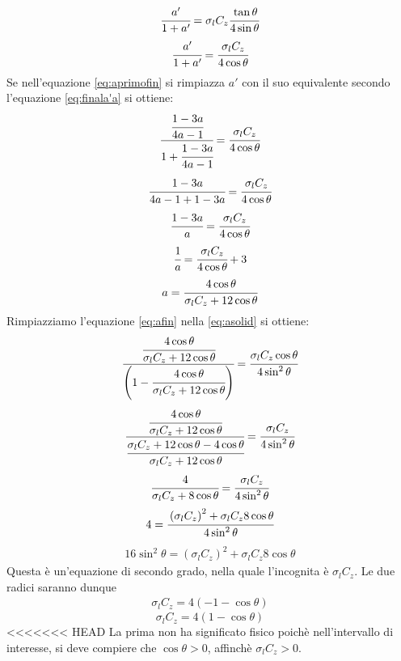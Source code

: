\begin{align*}
\cfrac{a'}{1+a'} = \sigma_l C_z \cfrac{\tan \theta}{4 \sin \theta}
\end{align*}
\begin{equation}\label{eq:aprimofin}
\cfrac{a'}{1+a'} = \cfrac{\sigma_l C_z}{4 \cos \theta}
\end{equation}
Se nell'equazione \ref{eq:aprimofin} si rimpiazza $a'$ con il suo equivalente secondo l'equazione \ref{eq:finala'a} si ottiene:
\begin{align*}
\cfrac{\cfrac{1-3a}{4a-1}}{1+\cfrac{1-3a}{4a-1}} = \cfrac{\sigma_l C_z}{4 \cos \theta}
\end{align*}
\begin{align*}
\cfrac{1-3a}{4a-1+1-3a} = \cfrac{\sigma_l C_z}{4 \cos \theta}
\end{align*}
\begin{align*}
\cfrac{1-3a}{a} = \cfrac{\sigma_l C_z }{4 \cos \theta}
\end{align*}
\begin{align*}
\cfrac{1}{a} = \cfrac{\sigma_l C_z}{4 \cos \theta} + 3
\end{align*}
\begin{equation}\label{eq:afin}
a = \cfrac{4 \cos \theta}{\sigma_l C_z +12 \cos \theta}
\end{equation}
Rimpiazziamo l'equazione \ref{eq:afin} nella \ref{eq:asolid} si ottiene:
\begin{align*}
\cfrac{\cfrac{4 \cos \theta}{\sigma_l C_z + 12 \cos \theta}}{\left( 1- \cfrac{4 \cos \theta}{\sigma_l C_z + 12 \cos \theta} \right)} = \cfrac{\sigma_l C_z \cos \theta}{4 \sin^2 \theta}
\end{align*}
\begin{align*}
\cfrac{\cfrac{4 \cos \theta}{\sigma_l C_z + 12 \cos \theta}}{\cfrac{\sigma_l C_z + 12 \cos \theta - 4 \cos \theta}{\sigma_l C_z + 12 \cos \theta}} = \cfrac{\sigma_l C_z}{4 \sin^2 \theta}
\end{align*}
\begin{align*}
\cfrac{4}{\sigma_l C_z + 8 \cos \theta} = \cfrac{\sigma_l C_z}{4 \sin^2 \theta}
\end{align*}
\begin{align*}
4 = \cfrac{\left( \sigma_l C_z \right)^2 + \sigma_l C_z 8 \cos \theta}{4 \sin^2 \theta}
\end{align*}
\begin{align*}
16 \sin^2 \theta = \left( \sigma_l C_z \right)^2 + \sigma_l C_z 8 \cos \theta
\end{align*}
Questa è un'equazione di secondo grado, nella quale l'incognita è $\sigma_l C_z$. Le due radici saranno dunque
\begin{align*}
\sigma_l C_z = 4 \left(-1 -\cos \theta \right)
\end{align*}
\begin{equation}\label{eq:sigmazc}
\sigma_l C_z = 4 \left(1- \cos \theta \right)
\end{equation}
<<<<<<< HEAD
La prima non ha significato fisico poichè nell'intervallo di interesse, si deve compiere che $\cos \theta > 0 $, affinchè $\sigma_l C_z > 0$.

